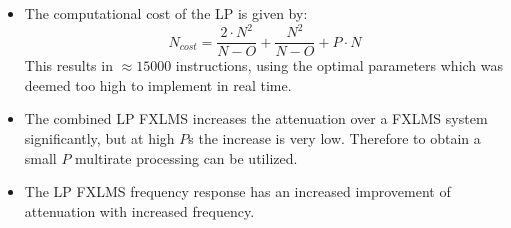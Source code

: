 \large
\begin{itemize}
\item The computational cost of the LP is given by:
	  \begin{equation}
	  N_{cost}=\frac{2\cdot N^2}{N-O}+\frac{N^2}{N-O}+P\cdot N
	  \end{equation}
	  This results in $\approx15000$ instructions, using the optimal parameters which was deemed too high to implement in real time. \\
\item The combined LP FXLMS increases the attenuation over a FXLMS system significantly, but at high $P$s the increase is very low. 
	  Therefore to obtain a small $P$ multirate processing can be utilized. \\ 
\item The LP FXLMS frequency response has an increased improvement of attenuation with increased frequency.

\end{itemize}

